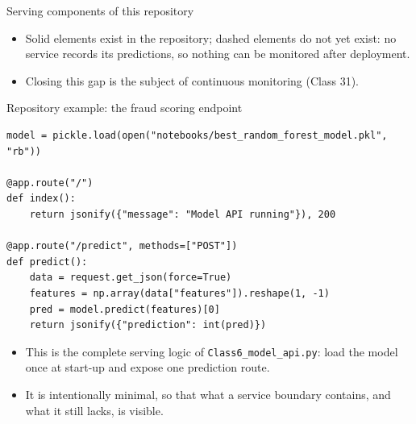 \begin{frame}{Serving components of this repository}
\centering
{}
\vspace{0.6em}
\begin{itemize}\footnotesize
\item Solid elements exist in the repository; dashed elements do not yet exist: no service records its predictions, so nothing can be monitored after deployment.
\item Closing this gap is the subject of continuous monitoring (Class 31).
\end{itemize}
\coursefooter
\end{frame}

\begin{frame}[fragile]{Repository example: the fraud scoring endpoint}
\begin{lstlisting}[style=coursepython]
model = pickle.load(open("notebooks/best_random_forest_model.pkl", "rb"))

@app.route("/")
def index():
    return jsonify({"message": "Model API running"}), 200

@app.route("/predict", methods=["POST"])
def predict():
    data = request.get_json(force=True)
    features = np.array(data["features"]).reshape(1, -1)
    pred = model.predict(features)[0]
    return jsonify({"prediction": int(pred)})
\end{lstlisting}
\begin{itemize}
\item This is the complete serving logic of \texttt{Class6\_model\_api.py}: load the model once at start-up and expose one prediction route.
\item It is intentionally minimal, so that what a service boundary contains, and what it still lacks, is visible.
\end{itemize}
\coursefooter
\end{frame}


